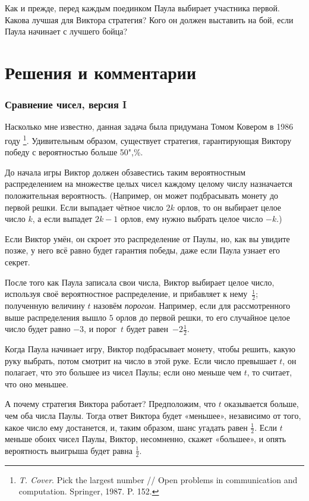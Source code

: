 \documentclass[twoside]{book}
\begin{document}
\medskip

Как и прежде, перед каждым поединком Паула выбирает участника первой.
Какова лучшая для Виктора стратегия? Кого он должен выставить на бой, если Паула начинает с лучшего бойца?


\section*{Решения и комментарии}

\subsubsection*{Сравнение чисел, версия I}%

Насколько мне известно, данная задача была придумана Томом Ковером %
в 1986 году%
\footnote{\emph{T. Cover}. Pick the largest number /\!/ {Open problems in communication and computation.} Springer, 1987. P. 152.}.
Удивительным образом, существует стратегия, гарантирующая Виктору победу с вероятностью больше 50",\%.

\medskip

До начала игры Виктор должен обзавестись таким вероятностным распределением на множестве целых чисел каждому целому числу назначается положительная вероятность.
(Например, он может подбрасывать монету до первой решки.
Если выпадает чётное число $2k$ орлов, то он выбирает целое число $k$, а если выпадет $2k-1$ орлов, ему нужно выбрать целое число $-k$.)

Если Виктор умён, он скроет это распределение от Паулы, но, как вы увидите позже, у него всё равно будет гарантия победы, даже если Паула узнает его секрет.

После того как Паула записала свои числа, Виктор выбирает целое число, используя своё вероятностное распределение, и прибавляет к нему~$\tfrac12$;
полученную величину $t$ назовём \emph{порогом}.
Например, если для рассмотренного выше распределения вышло $5$ орлов до первой решки, то его случайное целое число будет равно $-3$, и порог~$t$ будет равен~$-2 \tfrac12$.


Когда Паула начинает игру, Виктор подбрасывает монету, чтобы решить, какую руку выбрать, потом смотрит на число в этой руке.
Если число превышает $t$, он полагает, что это большее из чисел Паулы; если оно меньше чем $t$, то считает, что оно меньшее.

А почему стратегия Виктора работает? 
Предположим, что $t$ оказывается больше, чем оба числа Паулы.
Тогда ответ Виктора будет «меньшее», независимо от того, какое число ему достанется, и, таким образом, шанс угадать равен $\tfrac12$.
Если $t$ меньше обоих чисел Паулы, Виктор, несомненно, скажет «большее», и опять вероятность выигрыша будет равна $\tfrac12$.
\end{document}
